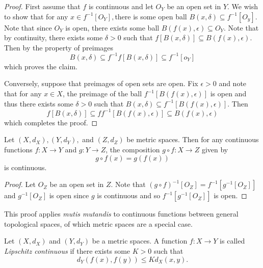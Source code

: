 \begin{proof}
First assume that $f$ is continuous and let $O_{Y}$ be an open set
in $Y$. We wish to show that for any $x\in f^{-1}\left[O_{Y}\right],$there
is some open ball $B\left(x,\delta\right)\subseteq f^{-1}\left[O_{y}\right].$
Note that since $O_{Y}$ is open, there exists some ball $B\left(f\left(x\right),\epsilon\right)\subseteq O_{Y}.$
Note that by continuity, there exists some $\delta>0$ such that $f\left[B\left(x,\delta\right)\right]\subseteq B\left(f\left(x\right),\epsilon\right)$.
Then by the property of preimages
\[
B\left(x,\delta\right)\subseteq f^{-1}f\left[B\left(x,\delta\right)\right]\subseteq f^{-1}\left[o_{Y}\right]
\]
which proves the claim.

Conversely, suppose that preimages of open sets are open. Fix $\epsilon>0$
and note that for any $x\in X$, the preimage of the ball $f^{-1}\left[B\left(f\left(x\right),\epsilon\right)\right]$
is open and thus there exists some $\delta>0$ such that $B\left(x,\delta\right)\subseteq f^{-1}\left[B\left(f\left(x\right),\epsilon\right)\right].$
Then
\[
f\left[B\left(x,\delta\right)\right]\subseteq ff^{-1}\left[B\left(f\left(x\right),\epsilon\right)\right]\subseteq B\left(f\left(x\right),\epsilon\right)
\]
which completes the proof.
\end{proof}
\begin{prop}
Let $\left(X,d_{X}\right),\left(Y,d_{Y}\right),$ and $\left(Z,d_{Z}\right)$
be metric spaces. Then for any continuous functions $f:X\to Y$ and
$g:Y\to Z$, the composition $g\circ f:X\to Z$ given by
\[
g\circ f\left(x\right)=g\left(f\left(x\right)\right)
\]
is continuous.
\end{prop}

\begin{proof}
Let $O_{Z}$ be an open set in $Z$. Note that $\left(g\circ f\right)^{-1}\left[O_{Z}\right]=f^{-1}\left[g^{-1}\left[O_{Z}\right]\right]$
and $g^{-1}\left[O_{Z}\right]$ is open since $g$ is continuous and
so $f^{-1}\left[g^{-1}\left[O_{Z}\right]\right]$ is open.
\end{proof}
\begin{rem*}
This proof applies \emph{mutis mutandis }to continuous functions between
general topological spaces, of which metric spaces are a special case.
\end{rem*}
\begin{defn}
\label{def:lipschitz}Let $\left(X,d_{X}\right)$ and $\left(Y,d_{Y}\right)$
be a metric spaces. A function $f:X\to Y$ is called \emph{Lipschitz
continuous }if there exists some $K>0$ such that 
\[
d_{Y}\left(f\left(x\right),f\left(y\right)\right)\leq Kd_{X}\left(x,y\right).
\]
\end{defn}

